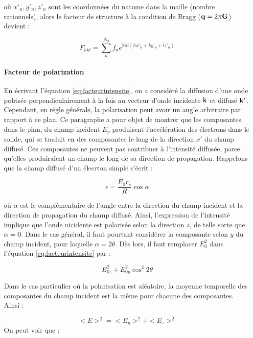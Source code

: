 où $x'_n, y'_n, z'_n$ sont les coordonnées du n\ieme atome dans la maille (nombre rationnels), alors le facteur de structure à la condition de Bragg ($\mathbf{q} = 2\pi \mathbf{G}$) devient :

\begin{equation}
    F_{hkl} = \sum_n^{N_b} f_n e^{2\pi i (h x'_n + k y'_n + l z'_n)}
\end{equation}

\paragraph{Facteur de polarization}

En écrivant l'équation \ref{eq:facteurintensite}, on a considéré la diffusion d'une onde polrisée perpendiculairement à la fois au vecteur d'onde incidente $\mathbf{k}$ et diffusé $\mathbf{k}'$. Cependant, en règle générale, la polarisation peut avoir un angle arbitraire par rapport à ce plan. Ce paragraphe a pour objet de montrer que les composantes dans le plan, du champ incident $E_y$ produisent l'accélération des électrons dans le solide, qui se traduit en des composantes le long de la direction $x'$ du champ diffusé. Ces composantes ne peuvent pas contribuer à l'intensité diffusée, parce qu'elles produiraient un champ le long de sa direction de propagation.
Rappelons que la champ diffusé d'un élecrton simple s'écrit :

\begin{equation}
    \epsilon = \frac{E_0 r_e}{R} \cos \alpha
\end{equation}

où $\alpha$ est le complémentaire de l'angle entre la direction du champ incident et la direction de propagation du champ diffusé. Ainsi, l'expression de l'intensité implique que l'onde nicidente est polarisée selon la direction $z$, de telle sorte que $\alpha = 0$. Dans le cas général, il faut pourtant considérer la composante selon $y$ du champ incident, pour laquelle $\alpha = 2 \theta$. Dès lors, il faut remplacer $E_0^2$ dans l'équation \ref{eq:facteurintensite} par :

\begin{equation}
    E_{0z}^2 + E_{0y}^2 \cos^2 2\theta
    \label{eq:champincid}
\end{equation}

Dans le cas particulier où la polarisation est aléatoire, la moyenne temporelle des composantes du champ incident est la même pour chacune des composantes. Ainsi :

\begin{equation}
    <E>^2 = <E_y>^2 + <E_z>^2
\end{equation}
On peut voir que :

